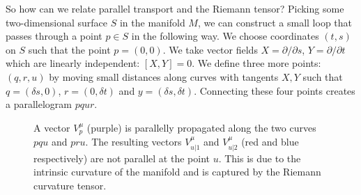 So how can we relate parallel transport and the Riemann tensor? Picking some two-dimensional surface $S$ in the manifold $M$, we can construct a small loop that passes through a point $p \in S$ in the following way. We choose coordinates $(t,s)$ on $S$ such that the point $p = (0,0)$. We take vector fields $X = \partial / \partial s$, $Y = \partial / \partial t$ which are linearly independent: $[X,Y] = 0$. We define three more points: $(q,r,u)$ by moving small distances along curves with tangents $X,Y$ such that $q = (\delta s,0)$, $r = (0, \delta t)$ and $y = (\delta s, \delta t)$. Connecting these four points creates a parallelogram $pqur$. 

\begin{figure}[!h]
\centering
{}
\caption[Illustration of parallel propagation]{A vector $V^\mu_p$ (purple) is parallelly propagated along the two curves $pqu$ and $pru$. The resulting vectors $V^\mu_{u|1}$ and $V^\mu_{u|2}$ (red and blue respectively) are not parallel at the point $u$. This is due to the intrinsic curvature of the manifold and is captured by the Riemann curvature tensor.}
\end{figure}

